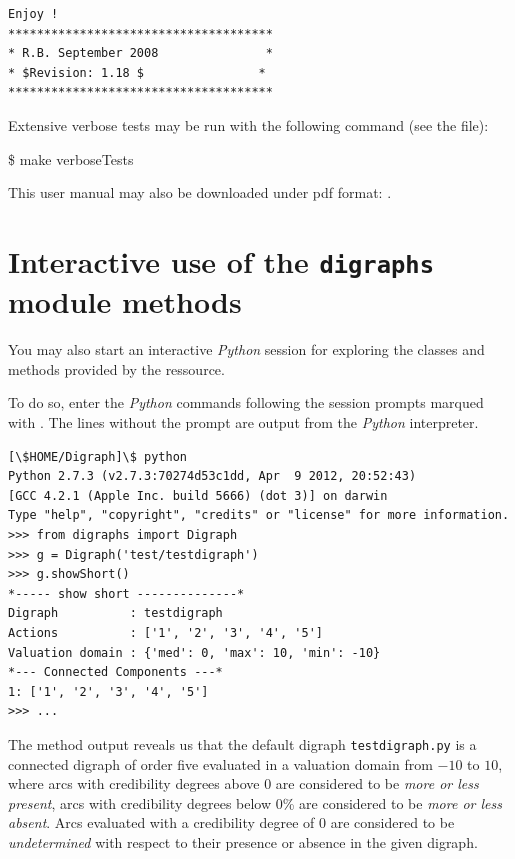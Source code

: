 \documentclass{article}
\newcommand{\+}{\verb+}
\renewcommand{\*}{\back{}}
\newcommand{\Dg}{\texttt{digraphs}\xspace }
\newcommand{\Py}{\emph{Python}\xspace }
\begin{document}
\begin{center}
\begin{example}
\begin{verbatim}
Enjoy !
*************************************
* R.B. September 2008               *
* $Revision: 1.18 $                *
*************************************

\end{verbatim}
\end{example}

Extensive verbose tests may be run with the following command (see the  file): 
\begin{example}
  \$ make verboseTests  
\end{example}

This user manual may also be downloaded under pdf format: . 

%%%%%%%%%%%%%%%%%%%%%%%%%%
\section{Interactive use of the \Dg module methods}
\label{sec:interactive}

You may also start an interactive \Py session for exploring the classes and methods provided by the  ressource.

To do so, enter the \Py commands following the session prompts marqued with \code{>>>}. The lines without the prompt are output from the \Py interpreter. 
\begin{example}
\begin{verbatim}
[\$HOME/Digraph]\$ python
Python 2.7.3 (v2.7.3:70274d53c1dd, Apr  9 2012, 20:52:43) 
[GCC 4.2.1 (Apple Inc. build 5666) (dot 3)] on darwin
Type "help", "copyright", "credits" or "license" for more information.
>>> from digraphs import Digraph
>>> g = Digraph('test/testdigraph')
>>> g.showShort()
*----- show short --------------*
Digraph          : testdigraph
Actions          : ['1', '2', '3', '4', '5']
Valuation domain : {'med': 0, 'max': 10, 'min': -10}
*--- Connected Components ---*
1: ['1', '2', '3', '4', '5']
>>> ...
\end{verbatim}
\end{example}
The   method output reveals us that the default digraph \+testdigraph.py+ is a connected digraph of order five evaluated in a valuation domain from $-10$ to $10$, where arcs with credibility degrees above 0 are considered to be \emph{more or less present}, arcs with credibility degrees below 0\% are considered to be \emph{more or less absent}. Arcs evaluated with a credibility degree of 0 are considered to be \emph{undetermined} with respect to their presence or absence in the given digraph.


\end{center}
\end{document}
